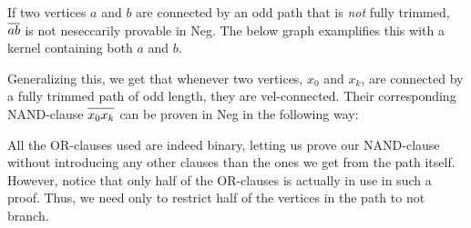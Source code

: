 If two vertices $a$ and $b$ are connected by an odd path that is \textit{not} fully trimmed, $\ol{ab}$ is not neseccarily provable in Neg.
The below graph examplifies this with a kernel containing both $a$ and $b$.\par
\begin{figure}[!h]
  \centering
  \caption{}
  \label{fig:kernel_untrimmed}
\end{figure}
Generalizing this, we get that whenever two vertices, $x_0$ and $x_k$, are connected by a fully trimmed path of odd length, they are vel-connected.
Their corresponding NAND-clause $\ol{x_0x_k}$ can be proven in Neg in the following way:\par
\begin{figure}[!h]
  \centering
  \begin{prooftree*}
  \end{prooftree*}
\caption{}
\label{fig:proof_x0xk}
\end{figure}
All the OR-clauses used are indeed binary, letting us prove our NAND-clause without introducing any other clauses than the ones we get from the path itself.
However, notice that only half of the OR-clauses is actually in use in such a proof.
Thus, we need only to restrict half of the vertices in the path to not branch.

